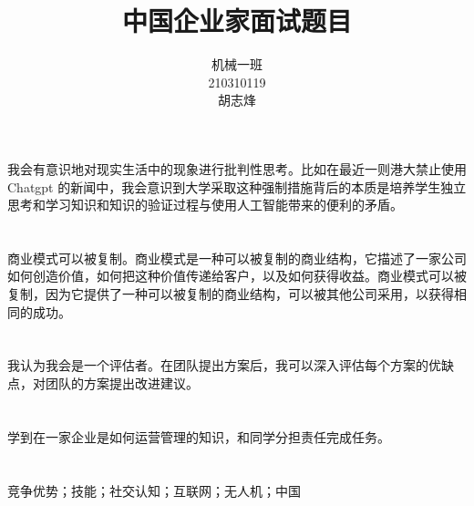 \documentclass[utf8]{ctexart}
\author{机械一班\\210310119\\胡志烽}
\title{中国企业家面试题目}
\date{}
\begin{document}
\maketitle
\section{}
我会有意识地对现实生活中的现象进行批判性思考。比如在最近一则港大禁止使用 Chatgpt 的新闻中，我会意识到大学采取这种强制措施背后的本质是培养学生独立思考和学习知识和知识的验证过程与使用人工智能带来的便利的矛盾。
\section{}
商业模式可以被复制。商业模式是一种可以被复制的商业结构，它描述了一家公司如何创造价值，如何把这种价值传递给客户，以及如何获得收益。商业模式可以被复制，因为它提供了一种可以被复制的商业结构，可以被其他公司采用，以获得相同的成功。
\section{}
我认为我会是一个评估者。在团队提出方案后，我可以深入评估每个方案的优缺点，对团队的方案提出改进建议。
\section{}
学到在一家企业是如何运营管理的知识，和同学分担责任完成任务。
\section{}
\begin{center}
\end{center}

\noindent{}

\noindent{} 竞争优势；技能；社交认知；互联网；无人机；中国
\end{document}
